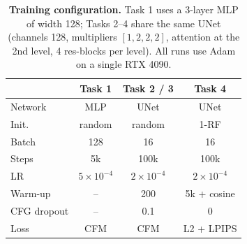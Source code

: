 \begin{table}[t]
  \centering
  \footnotesize
  \setlength{\tabcolsep}{3pt}
  \caption{\textbf{Training configuration.} Task 1 uses a 3-layer MLP of width 128; Tasks 2--4 share the same UNet (channels 128, multipliers $[1,2,2,2]$, attention at the 2nd level, 4 res-blocks per level). All runs use Adam on a single RTX 4090.}
  \label{tab:hparams}
  \begin{tabular}{@{}lccc@{}}
    \toprule
    & Task 1 & Task 2 / 3 & Task 4 \\
    \midrule
    Network     & MLP & UNet & UNet \\
    Init.       & random & random & 1-RF \\
    Batch       & 128 & 16 & 16 \\
    Steps       & 5k & 100k & 100k \\
    LR          & $5\!\times\!10^{-4}$ & $2\!\times\!10^{-4}$ & $2\!\times\!10^{-4}$ \\
    Warm-up     & -- & 200 & 5k + cosine \\
    CFG dropout & -- & 0.1 & 0 \\
    Loss        & CFM & CFM & L2 + LPIPS \\
    \bottomrule
  \end{tabular}
\end{table}
